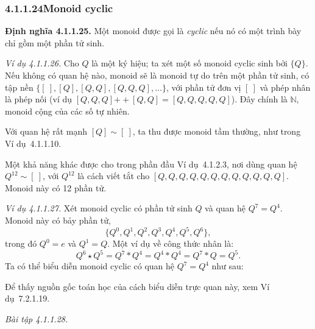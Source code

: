 \subsubsection*{4.1.1.24\quad Monoid cyclic}

\noindent\textbf{Định nghĩa 4.1.1.25.} Một monoid được gọi là \emph{cyclic} nếu nó có một trình bày chỉ gồm một phần tử sinh.

\noindent\textit{Ví dụ 4.1.1.26.} Cho $Q$ là một ký hiệu; ta xét một số monoid cyclic sinh bởi $\{Q\}$. Nếu không có quan hệ nào, monoid sẽ là monoid tự do trên một phần tử sinh, có tập nền $\{[\ ],[Q],[Q,Q],[Q,Q,Q],\ldots\}$, với phần tử đơn vị $[\ ]$ và phép nhân là phép nối (ví dụ $[Q,Q,Q]\mathbin{+\!+}[Q,Q]=[Q,Q,Q,Q,Q]$). Đây chính là $\mathbb{N}$, monoid cộng của các số tự nhiên.

Với quan hệ rất mạnh $[Q]\sim[\ ]$, ta thu được monoid tầm thường, như trong Ví dụ~4.1.1.10.

Một khả năng khác được cho trong phần đầu Ví dụ~4.1.2.3, nơi dùng quan hệ $Q^{12}\sim[\ ]$, với $Q^{12}$ là cách viết tắt cho $[Q,Q,Q,Q,Q,Q,Q,Q,Q,Q,Q,Q]$. Monoid này có 12 phần tử.

\noindent\textit{Ví dụ 4.1.1.27.} Xét monoid cyclic có phần tử sinh $Q$ và quan hệ $Q^7=Q^4$. Monoid này có bảy phần tử,
\[
\{Q^0,Q^1,Q^2,Q^3,Q^4,Q^5,Q^6\},
\]
trong đó $Q^0=e$ và $Q^1=Q$. Một ví dụ về công thức nhân là:
\[
Q^6\star Q^5=Q^7*Q^4=Q^4*Q^4=Q^7*Q=Q^5.
\]
Ta có thể biểu diễn monoid cyclic có quan hệ $Q^7=Q^4$ như sau:
\begin{center}
\end{center}
Để thấy nguồn gốc toán học của cách biểu diễn trực quan này, xem Ví dụ~7.2.1.19.

\noindent\textit{Bài tập 4.1.1.28.}\keepwithnext

